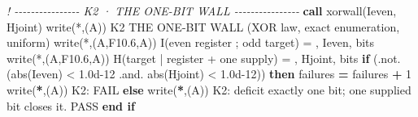 \documentclass[10pt]{article}
\renewcommand{\_}{\origunderscore\allowbreak}
\newenvironment{Shaded}{}{}
\newcommand{\BuiltInTok}[1]{#1}
\newcommand{\CommentTok}[1]{\textit{#1}}
\newcommand{\DecValTok}[1]{#1}
\newcommand{\FloatTok}[1]{#1}
\newcommand{\FunctionTok}[1]{#1}
\newcommand{\KeywordTok}[1]{\textbf{#1}}
\newcommand{\NormalTok}[1]{#1}
\newcommand{\OperatorTok}[1]{#1}
\newcommand{\StringTok}[1]{#1}
\begin{document}
\begin{Shaded}
\begin{Highlighting}[]
  \CommentTok{! {-}{-}{-}{-}{-}{-}{-}{-}{-}{-}{-}{-}{-}{-}{-}{-} K2 · THE ONE{-}BIT WALL {-}{-}{-}{-}{-}{-}{-}{-}{-}{-}{-}{-}{-}{-}{-}{-}}
  \KeywordTok{call}\NormalTok{ xor\_wall(I\_even, H\_joint)}
  \FunctionTok{write(*}\NormalTok{,}\StringTok{\textquotesingle{}(A)\textquotesingle{}}\FunctionTok{)} \StringTok{\textquotesingle{}K2 THE ONE{-}BIT WALL (XOR law, exact enumeration, uniform)\textquotesingle{}}
  \FunctionTok{write(*}\NormalTok{,}\StringTok{\textquotesingle{}(A,F10.6,A)\textquotesingle{}}\FunctionTok{)} \StringTok{\textquotesingle{}  I(even register ; odd target)     = \textquotesingle{}}\NormalTok{, I\_even, }\StringTok{\textquotesingle{} bits\textquotesingle{}}
  \FunctionTok{write(*}\NormalTok{,}\StringTok{\textquotesingle{}(A,F10.6,A)\textquotesingle{}}\FunctionTok{)} \StringTok{\textquotesingle{}  H(target | register + one supply) = \textquotesingle{}}\NormalTok{, H\_joint, }\StringTok{\textquotesingle{} bits\textquotesingle{}}
  \KeywordTok{if}\NormalTok{ (}\OperatorTok{.not.}\NormalTok{ (}\BuiltInTok{abs}\NormalTok{(I\_even) }\OperatorTok{\textless{}} \FloatTok{1.0d{-}12} \OperatorTok{.and.} \BuiltInTok{abs}\NormalTok{(H\_joint) }\OperatorTok{\textless{}} \FloatTok{1.0d{-}12}\NormalTok{)) }\KeywordTok{then}
\BuiltInTok{     f}\NormalTok{ailures }\KeywordTok{=}\NormalTok{ failures }\KeywordTok{+} \DecValTok{1}
\BuiltInTok{     w}\NormalTok{rite(}\KeywordTok{*}\NormalTok{,}\StringTok{\textquotesingle{}(A)\textquotesingle{}}\NormalTok{) }\StringTok{\textquotesingle{}  K2: FAIL\textquotesingle{}}
  \KeywordTok{else}
\BuiltInTok{     w}\NormalTok{rite(}\KeywordTok{*}\NormalTok{,}\StringTok{\textquotesingle{}(A)\textquotesingle{}}\NormalTok{) }\StringTok{\textquotesingle{}  K2: deficit exactly one bit; one supplied bit closes it. PASS\textquotesingle{}}
  \KeywordTok{end if}


\end{Highlighting}
\end{Shaded}
\end{document}

